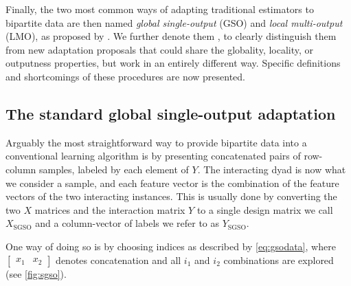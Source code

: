Finally, the two most common ways of adapting traditional estimators to bipartite data are then named \emph{global single-output} (GSO) and \emph{local multi-output} (LMO), as proposed by . We further denote them , to clearly distinguish them from new adaptation proposals that could share the globality, locality, or outputness properties, but work in an entirely different way.
%
Specific definitions and shortcomings of these procedures are now presented.


\subsection{The standard global single-output adaptation}
\label{sec:sgso}

Arguably the most straightforward way to provide bipartite data into a conventional learning algorithm 
is by presenting concatenated pairs of row-column samples, labeled by each element of $Y$.
%
The interacting dyad is now what we consider a sample, and each feature vector is the combination of the feature vectors of the two interacting instances.
This is usually done by converting the two $X$ matrices and the
interaction matrix $Y$ to a single design matrix we call $X_\text{SGSO}$ and a column-vector of labels we refer to as $Y_\text{SGSO}$.

One way of doing so is by choosing indices as described by \autoref{eq:gsodata}, where
$\begin{bmatrix} x_1 & x_2\end{bmatrix}$ denotes concatenation and all $i_1$ and
$i_2$ combinations are explored (see \autoref{fig:sgso}).

